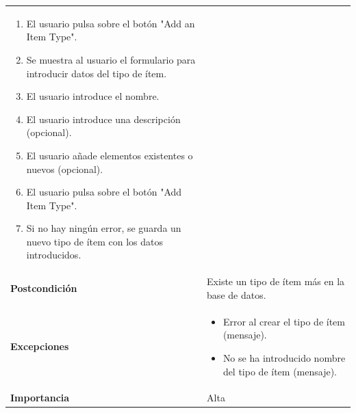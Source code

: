 \documentclass[
]{article}
\providecommand{\tightlist}{%
  \setlength{\itemsep}{0pt}\setlength{\parskip}{0pt}}
\begin{document}
\begin{longtable}[]{@{}ll@{}}
\begin{minipage}[t]{0.73\columnwidth}
\begin{enumerate}
\tightlist
\item
  El usuario pulsa sobre el botón "Add an Item Type".
\item
  Se muestra al usuario el formulario para introducir datos del tipo de
  ítem.
\item
  El usuario introduce el nombre.
\item
  El usuario introduce una descripción (opcional).
\item
  El usuario añade elementos existentes o nuevos (opcional).
\item
  El usuario pulsa sobre el botón "Add Item Type".
\item
  Si no hay ningún error, se guarda un nuevo tipo de ítem con los datos
  introducidos.
\end{enumerate}\strut
\end{minipage}\tabularnewline
\begin{minipage}[t]{0.21\columnwidth}\raggedright
\textbf{Postcondición}\strut
\end{minipage} & \begin{minipage}[t]{0.73\columnwidth}\raggedright
Existe un tipo de ítem más en la base de datos.\strut
\end{minipage}\tabularnewline
\begin{minipage}[t]{0.21\columnwidth}\raggedright
\textbf{Excepciones}\strut
\end{minipage} & \begin{minipage}[t]{0.73\columnwidth}\raggedright
\begin{itemize}
\tightlist
\item
  Error al crear el tipo de ítem (mensaje).
\item
  No se ha introducido nombre del tipo de ítem (mensaje).
\end{itemize}\strut
\end{minipage}\tabularnewline
\begin{minipage}[t]{0.21\columnwidth}\raggedright
\textbf{Importancia}\strut
\end{minipage} & \begin{minipage}[t]{0.73\columnwidth}\raggedright
Alta\strut
\end{minipage}\tabularnewline
\bottomrule
\end{longtable}
\end{document}

